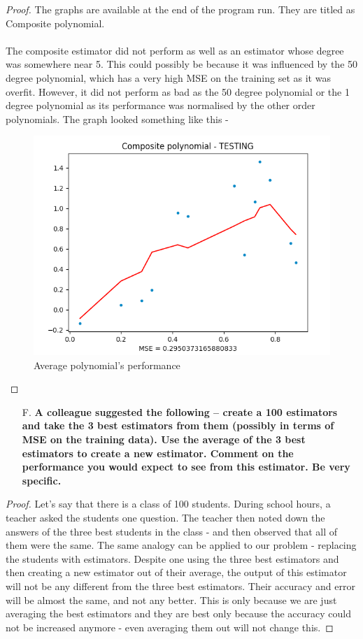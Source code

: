 \documentclass{article}
\theoremstyle{case}
\begin{document}
\begin{proof} 
The graphs are available at the end of the program run. They are titled as Composite polynomial. \\ \\
The composite estimator did not perform as well as an estimator whose degree was somewhere near 5. This could possibly be because it was influenced by the 50 degree polynomial, which has a very high MSE on the training set as it was overfit. However, it did not perform as bad as the 50 degree polynomial or the 1 degree polynomial as its performance was normalised by the other order polynomials. The graph looked something like this - 
\begin{figure}[h]
            \caption{Average polynomial's performance}
            \includegraphics[scale=0.4,width=\textwidth]{n3.png}
            \end{figure}
\end{proof}
\begin{enumerate}
    \item [F.] \textbf{A colleague suggested the following – create a 100 estimators and
take the 3 best estimators from them (possibly in terms of MSE
on the training data). Use the average of the 3 best estimators to
create a new estimator. Comment on the performance you would
expect to see from this estimator. Be very specific.}
\end{enumerate} 
\begin{proof} 
Let's say that there is a class of 100 students. During school hours, a teacher asked the students one question. The teacher then noted down the answers of the three best students in the class - and then observed that all of them were the same. The same analogy can be applied to our problem - replacing the students with estimators. Despite one using the three best estimators and then creating a new estimator out of their average, the output of this estimator will not be any different from the three best estimators. Their accuracy and error will be almost the same, and not any better. This is only because we are just averaging the best estimators and they are best only because the accuracy could not be increased anymore - even averaging them out will not change this.
\end{proof}
\end{document}
